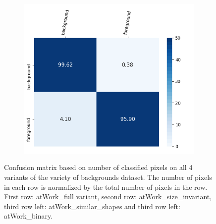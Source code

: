 \begin{figure}[!htb]
\begin{subfigure}[c]{.6\textwidth}
		\end{subfigure}
		\begin{subfigure}[c]{.3\textwidth}
			\centering
			\includegraphics[width=1\linewidth]{images/cm_binary}
		\end{subfigure}
		\caption{Confusion matrix based on number of classified pixels on all 4 variants of the variety of backgrounds dataset. The number of pixels in each row is normalized by the total number of pixels in the row. First row: atWork\_full variant, second row: atWork\_size\_invariant, third row left: atWork\_similar\_shapes and third row left: atWork\_binary.}
		\label{Fig:cm}
	\end{figure}
	
